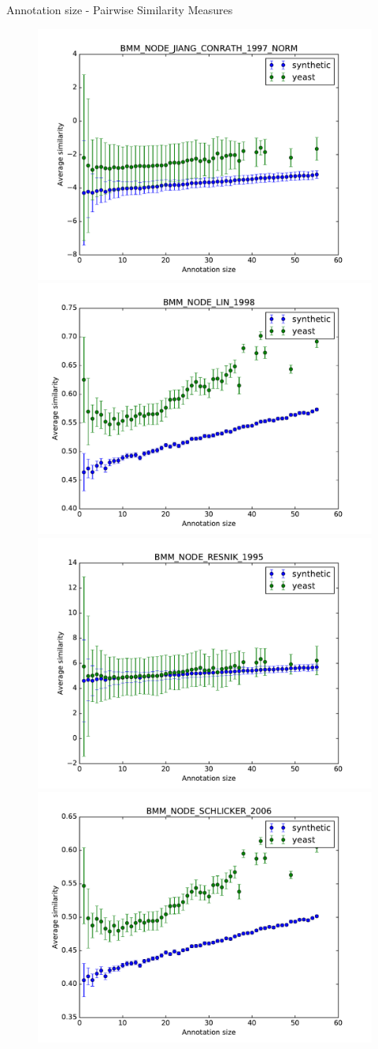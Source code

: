 \documentclass{beamer}
\begin{document}
\begin{frame}{Annotation size - Pairwise Similarity Measures}

\begin{figure}
\includegraphics[width=0.5\linewidth, height=0.4\textheight]{pairwise/SIM_GROUPWISE_BMM_SIM_PAIRWISE_DAG_NODE_JIANG_CONRATH_1997_NORM_avg.pdf} 
\includegraphics[width=0.5\linewidth, height=0.4\textheight]{pairwise/SIM_GROUPWISE_BMM_SIM_PAIRWISE_DAG_NODE_LIN_1998_avg.pdf}\\
\includegraphics[width=0.5\linewidth, height=0.4\textheight]{pairwise/SIM_GROUPWISE_BMM_SIM_PAIRWISE_DAG_NODE_RESNIK_1995_avg.pdf}
\includegraphics[width=0.5\linewidth, height=0.4\textheight]{pairwise/SIM_GROUPWISE_BMM_SIM_PAIRWISE_DAG_NODE_SCHLICKER_2006_avg.pdf}
\end{figure}

\end{frame}
\end{document}
